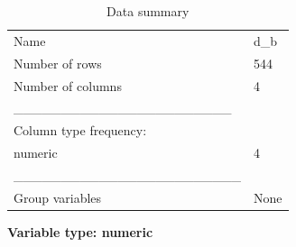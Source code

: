\documentclass[
  letterpaper,
  DIV=11,
  numbers=noendperiod]{scrreprt}
\begin{document}
\begin{longtable}[]{@{}ll@{}}
\caption{Data summary}\tabularnewline
\toprule\noalign{}
\endfirsthead
\endhead
\bottomrule\noalign{}
\endlastfoot
Name & d\_b \\
Number of rows & 544 \\
Number of columns & 4 \\
\_\_\_\_\_\_\_\_\_\_\_\_\_\_\_\_\_\_\_\_\_\_\_ & \\
Column type frequency: & \\
numeric & 4 \\
\_\_\_\_\_\_\_\_\_\_\_\_\_\_\_\_\_\_\_\_\_\_\_\_ & \\
Group variables & None \\
\end{longtable}

\textbf{Variable type: numeric}
\end{document}
